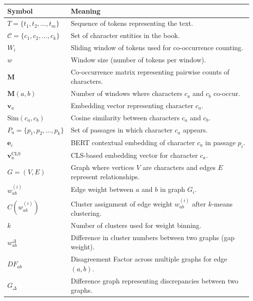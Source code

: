 \documentclass[a4paper,12pt]{report}
\begin{document}
\begin{table}[h!]
\centering
\renewcommand{\arraystretch}{1.3}
\begin{tabular}{@{}ll@{}}
\toprule
\textbf{Symbol} & \textbf{Meaning} \\ 
\midrule
$T = \{t_1, t_2, \dots, t_m\}$ & Sequence of tokens representing the text. \\
$\mathcal{C} = \{c_1, c_2, \dots, c_k\}$ & Set of character entities in the book. \\
$W_i$ & Sliding window of tokens used for co-occurrence counting. \\
$w$ & Window size (number of tokens per window). \\
$\mathbf{M}$ & Co-occurrence matrix representing pairwise counts of characters. \\
$\mathbf{M}(a,b)$ & Number of windows where characters $c_a$ and $c_b$ co-occur. \\
$\mathbf{v}_a$ & Embedding vector representing character $c_a$. \\
$\text{Sim}(c_a, c_b)$ & Cosine similarity between characters $c_a$ and $c_b$. \\
$P_a = \{p_1, p_2, \dots, p_k\}$ & Set of passages in which character $c_a$ appears. \\
$\mathbf{e}_i$ & BERT contextual embedding of character $c_a$ in passage $p_i$. \\
$\mathbf{v}_a^{\text{CLS}}$ & CLS-based embedding vector for character $c_a$. \\
$G = (V, E)$ & Graph where vertices $V$ are characters and edges $E$ represent relationships. \\
$w_{ab}^{(i)}$ & Edge weight between $a$ and $b$ in graph $G_i$. \\
$C(w_{ab}^{(i)})$ & Cluster assignment of edge weight $w_{ab}^{(i)}$ after $k$-means clustering. \\
$k$ & Number of clusters used for weight binning. \\
$w_{ab}^{\Delta}$ & Difference in cluster numbers between two graphs (gap weight). \\
$DF_{ab}$ & Disagreement Factor across multiple graphs for edge $(a,b)$. \\
$G_{\Delta}$ & Difference graph representing discrepancies between two graphs. \\
\bottomrule
\end{tabular}
\end{table}
	
	\newpage	
 
\end{document}
